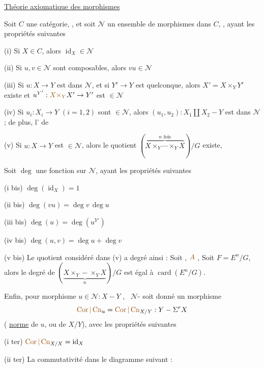 \uline{Théorie axiomatique des morphismes }

Soit $C$ une catégorie, , et soit $\mathcal{N}$ un ensemble de morphismes dans $C$, , ayant les propriétés suivantes

(i) Si $X\in C$, alors $\operatorname{id}_X\in\mathcal{N}$

(ii) Si $u,v\in\mathcal{N}$ sont composables, alors $vu\in\mathcal{N}$

(iii) Si $u:X\longrightarrow Y$ est dans $\mathcal{N}$, et si $Y'\to Y$ est quelconque, alors $X'=X\times_Y Y'$ existe et $u^{Y'}:\deleted{\unsure{X\times_Y}}X'\to Y'$ est $\in\mathcal{N}$

(iv) Si $u_i:X_i\to Y$ $(i=1,2)$ sont $\in\mathcal{N}$, alors $(u_1,u_2):X_1\amalg X_2-Y$ est dans $\mathcal{N}$ ; de plus, l' de     

(v) Si $u:X\to Y$ est $\in\mathcal{N}$, alors  le quotient $(\overbrace{X\times_Y\cdots\times_Y X}^{n\text{ fois}})/G$ existe, 

Soit $\deg$ une fonction sur $\mathcal{N}$,  ayant les propriétés suivantes

(i bis) $\deg(\operatorname{id}_X)=1$

(ii bis) $\deg(vu)=\deg v\,\deg u$

(iii bis) $\deg(u)=\deg(u^{Y'})$

(iv bis) $\deg(u,v)=\deg u+\deg v$

(v bis) Le quotient considéré dans (v) a  degré   ainsi : Soit , $\unsure{A}$ ,
Soit $F=E^n/G$, alors  le degré de $(\underbrace{X\times_Y-\times_Y X}_{n})/G$ est égal à $\operatorname{card}(E^n/G)$.

Enfin, pour  morphisme $u\in\mathcal{N}:X-Y$ , \ $\mathcal{N}$- soit donné un morphisme
\[
\unsure{\operatorname{Cor}|\operatorname{Cn}}_u=\unsure{\operatorname{Cor}|\operatorname{Cn}}_{X/Y}:Y-\Sigma^r X
\]
(  \uline{norme} de $u$, ou de $X/Y$), avec les propriétés suivantes

(i ter) $\unsure{\operatorname{Cor}|\operatorname{Cn}}_{X/X}=\operatorname{id}_X$

(ii ter) La commutativité dans le diagramme suivant :

